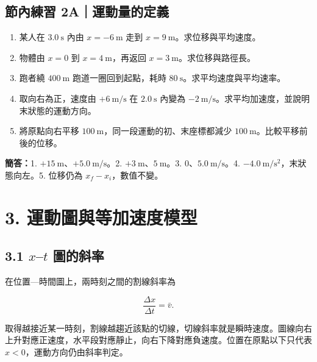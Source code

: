 \documentclass[11pt,a4paper]{article}
\providecommand{\tightlist}{%
  \setlength{\itemsep}{0pt}\setlength{\parskip}{0pt}}
\begin{document}
\begin{HandoutSelfCheck}

\subsection{節內練習 2A｜運動量的定義}\label{ux7bc0ux5167ux7df4ux7fd2-2aux904bux52d5ux91cfux7684ux5b9aux7fa9}

\begin{enumerate}
\def\labelenumi{\arabic{enumi}.}
\tightlist
\item
  某人在 \(3.0\ \mathrm s\) 內由 \(x=-6\ \mathrm m\) 走到 \(x=9\ \mathrm m\)。求位移與平均速度。
\item
  物體由 \(x=0\) 到 \(x=4\ \mathrm m\)，再返回 \(x=3\ \mathrm m\)。求位移與路徑長。
\item
  跑者繞 \(400\ \mathrm m\) 跑道一圈回到起點，耗時 \(80\ \mathrm s\)。求平均速度與平均速率。
\item
  取向右為正，速度由 \(+6\ \mathrm{m/s}\) 在 \(2.0\ \mathrm s\) 內變為 \(-2\ \mathrm{m/s}\)。求平均加速度，並說明末狀態的運動方向。
\item
  將原點向右平移 \(100\ \mathrm m\)，同一段運動的初、末座標都減少 \(100\ \mathrm m\)。比較平移前後的位移。
\end{enumerate}

\textbf{簡答：}1. \(+15\ \mathrm m\)、\(+5.0\ \mathrm{m/s}\)。2. \(+3\ \mathrm m\)、\(5\ \mathrm m\)。3. \(0\)、\(5.0\ \mathrm{m/s}\)。4. \(-4.0\ \mathrm{m/s^2}\)，末狀態向左。5. 位移仍為 \(x_f-x_i\)，數值不變。

\end{HandoutSelfCheck}

\section{3. 運動圖與等加速度模型}\label{ux904bux52d5ux5716ux8207ux7b49ux52a0ux901fux5ea6ux6a21ux578b}

\subsection{\texorpdfstring{3.1 \(x\)--\(t\) 圖的斜率}{3.1 x--t 圖的斜率}}\label{xt-ux5716ux7684ux659cux7387}

在位置---時間圖上，兩時刻之間的割線斜率為

\[
\frac{\Delta x}{\Delta t}=\bar v.
\]

取得越接近某一時刻，割線越趨近該點的切線，切線斜率就是瞬時速度。圖線向右上升對應正速度，水平段對應靜止，向右下降對應負速度。位置在原點以下只代表 \(x<0\)，運動方向仍由斜率判定。
\end{document}
